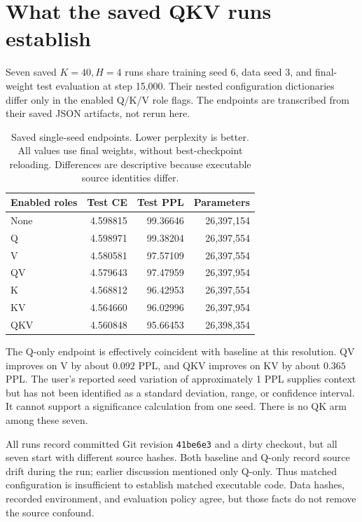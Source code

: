 \documentclass[11pt,letterpaper]{article}
\theoremstyle{remark}
\begin{document}
\section{What the saved QKV runs establish}
\label{sec:empirical}
Seven saved $K=40,H=4$ runs share training seed 6, data seed 3, and final-weight test evaluation at step 15,000. Their nested configuration dictionaries differ only in the enabled Q/K/V role flags. The endpoints are transcribed from their saved JSON artifacts, not rerun here.

\begin{table}[tb]
\centering
\caption{Saved single-seed endpoints. Lower perplexity is better. All values use final weights, without best-checkpoint reloading. Differences are descriptive because executable source identities differ.}
\begin{tabular}{@{}lrrr@{}}
\toprule
Enabled roles & Test CE & Test PPL & Parameters\\
\midrule
None & 4.598815 & 99.36646 & 26,397,154\\
Q & 4.598971 & 99.38204 & 26,397,554\\
V & 4.580581 & 97.57109 & 26,397,554\\
QV & 4.579643 & 97.47959 & 26,397,954\\
K & 4.568812 & 96.42953 & 26,397,554\\
KV & 4.564660 & 96.02996 & 26,397,954\\
QKV & 4.560848 & 95.66453 & 26,398,354\\
\bottomrule
\end{tabular}
\label{tab:runs}
\end{table}

The Q-only endpoint is effectively coincident with baseline at this resolution. QV improves on V by about $0.092$ PPL, and QKV improves on KV by about $0.365$ PPL. The user's reported seed variation of approximately 1 PPL supplies context but has not been identified as a standard deviation, range, or confidence interval. It cannot support a significance calculation from one seed. There is no QK arm among these seven.

All runs record committed Git revision \texttt{41be6e3} and a dirty checkout, but all seven start with different source hashes. Both baseline and Q-only record source drift during the run; earlier discussion mentioned only Q-only. Thus matched configuration is insufficient to establish matched executable code. Data hashes, recorded environment, and evaluation policy agree, but those facts do not remove the source confound.
\end{document}
